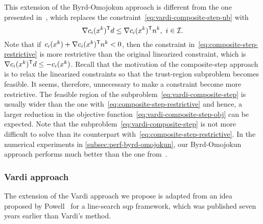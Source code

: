 This extension of the Byrd-Omojokun approach is different from the one presented in~\cite[\S~15.4.4]{Conn_Gould_Toint_2000}, which replaces the constraint~\cref{eq:vardi-composite-step-ub} with
\begin{equation}
    \label{eq:composite-step-restrictive}
    \nabla \con{i}(\iter[k])^{\T} \step \le \nabla \con{i}(\iter[k])^{\T} \nstep[k], ~ i \in \iub.
\end{equation}
Note that if~$\con{i}(\iter[k]) + \nabla \con{i}(\iter[k])^{\T} \nstep[k] < 0$, then the constraint in~\cref{eq:composite-step-restrictive} is more restrictive than the original linearized constraint, which is~$\nabla \con{i}(\iter[k])^{\T} \step \le -\con{i}(\iter[k])$.
Recall that the motivation of the composite-step approach is to relax the linearized constraints so that the trust-region subproblem becomes feasible.
It seems, therefore, unnecessary to make a constraint become more restrictive.
The feasible region of the subproblem~\cref{eq:vardi-composite-step} is usually wider than the one with~\cref{eq:composite-step-restrictive} and hence, a larger reduction in the objective function~\cref{eq:vardi-composite-step-obj} can be expected.
Note that the subproblem~\cref{eq:vardi-composite-step} is not more difficult to solve than its counterpart with~\cref{eq:composite-step-restrictive}.
In the numerical experiments in \cref{subsec:perf-byrd-omojokun}, our Byrd-Omojokun approach performs much better than the one from~\cite[\S~15.4.4]{Conn_Gould_Toint_2000}.

\subsubsection{Vardi approach}

The extension of the Vardi approach we propose is adapted from an idea proposed by Powell~\cite[Eqs.~(2.7) and~(2.8)]{Powell_1978a} for a line-search \gls{sqp} framework, which was published seven years earlier than Vardi's method.

